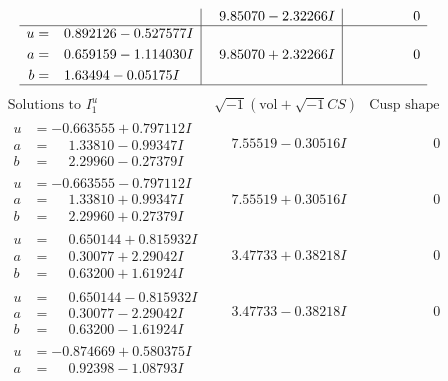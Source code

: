 \documentclass[1p]{elsarticle_modified}
\theoremstyle{definition}
\newcommand{\I}{\sqrt{-1}}
\begin{document}
$$\begin{array}{c|c|c}
 & \phantom{-}9.85070 - 2.32266 I & \phantom{-0.000000 } 0 \\ \hline\begin{aligned}
u &= \phantom{-}0.892126 - 0.527577 I \\
a &= \phantom{-}0.659159 - 1.114030 I \\
b &= \phantom{-}1.63494 - 0.05175 I\end{aligned}
 & \phantom{-}9.85070 + 2.32266 I & \phantom{-0.000000 } 0\\
 \hline 
 \end{array}$$\newpage$$\begin{array}{c|c|c}  
\text{Solutions to }I^u_{1}& \I (\text{vol} + \sqrt{-1}CS) & \text{Cusp shape}\\
 \hline 
\begin{aligned}
u &= -0.663555 + 0.797112 I \\
a &= \phantom{-}1.33810 - 0.99347 I \\
b &= \phantom{-}2.29960 - 0.27379 I\end{aligned}
 & \phantom{-}7.55519 - 0.30516 I & \phantom{-0.000000 } 0 \\ \hline\begin{aligned}
u &= -0.663555 - 0.797112 I \\
a &= \phantom{-}1.33810 + 0.99347 I \\
b &= \phantom{-}2.29960 + 0.27379 I\end{aligned}
 & \phantom{-}7.55519 + 0.30516 I & \phantom{-0.000000 } 0 \\ \hline\begin{aligned}
u &= \phantom{-}0.650144 + 0.815932 I \\
a &= \phantom{-}0.30077 + 2.29042 I \\
b &= \phantom{-}0.63200 + 1.61924 I\end{aligned}
 & \phantom{-}3.47733 + 0.38218 I & \phantom{-0.000000 } 0 \\ \hline\begin{aligned}
u &= \phantom{-}0.650144 - 0.815932 I \\
a &= \phantom{-}0.30077 - 2.29042 I \\
b &= \phantom{-}0.63200 - 1.61924 I\end{aligned}
 & \phantom{-}3.47733 - 0.38218 I & \phantom{-0.000000 } 0 \\ \hline\begin{aligned}
u &= -0.874669 + 0.580375 I \\
a &= \phantom{-}0.92398 - 1.08793 I \\

\end{aligned}
\end{array}$$
\end{document}
